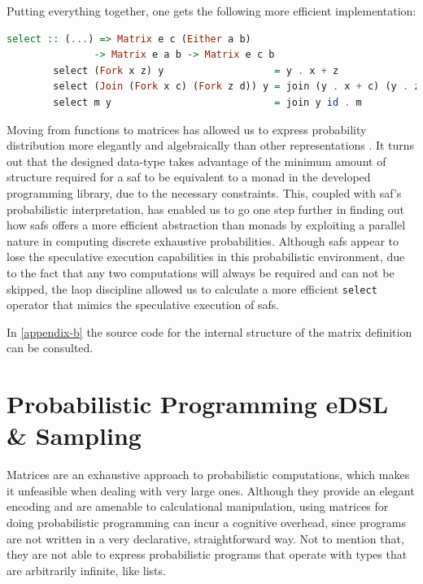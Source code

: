 \documentclass[
  oneside,
  11pt, a4paper,
  footinclude=true,
  headinclude=true,
  cleardoublepage=empty
]{scrbook}
\theoremstyle{definition}
\theoremstyle{definition}
\begin{document}
        \noindent Putting everything together, one gets the following more efficient implementation:
        
        \begin{lstlisting}[language=Haskell, caption={Final result},captionpos=b]
        select :: (...) => Matrix e c (Either a b) 
               -> Matrix e a b -> Matrix e c b
        select (Fork x z) y                   = y . x + z
        select (Join (Fork x c) (Fork z d)) y = join (y . x + c) (y . z + d)
        select m y                            = join y id . m
        \end{lstlisting}{}
        
        Moving from functions to matrices has allowed us to express probability distribution more elegantly and algebraically than other representations \citep{erwig_kollmansberger_2006, kidd2007build}. It turns out that the designed data-type takes advantage of the minimum amount of structure required for a \gls{saf} to be equivalent to a monad in the developed programming library, due to the necessary constraints. This, coupled with \gls{saf}'s probabilistic interpretation, has enabled us to go one step further in finding out how \glspl{saf} offers a more efficient abstraction than monads by exploiting a parallel nature in computing discrete exhaustive probabilities. Although \glspl{saf} appear to lose the speculative execution capabilities in this probabilistic environment, due to the fact that any two computations will always be required and can not be skipped, the \gls{laop} discipline allowed us to calculate a more efficient \texttt{select} operator that mimics the speculative execution of \glspl{saf}.
        
        In \ref{appendix-b} the source code for the internal structure of the matrix definition can be consulted.
        
    \section{Probabilistic Programming eDSL \& Sampling}\label{prob-edsl}
    
    Matrices are an exhaustive approach to probabilistic computations, which makes it unfeasible when dealing with very large ones. Although they provide an elegant encoding and are amenable to calculational manipulation, using matrices for doing probabilistic programming can incur a cognitive overhead, since programs are not written in a very declarative, straightforward way. Not to mention that, they are not able to express probabilistic programs that operate with types that are arbitrarily infinite, like lists.
    
\end{document}
